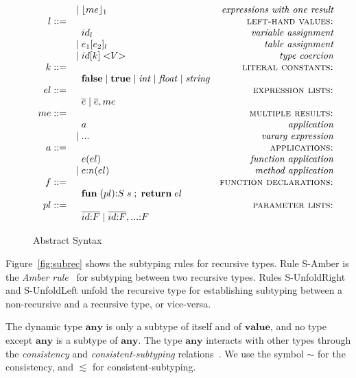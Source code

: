 \documentclass[preprint]{sigplanconf}
\newcommand{\Value}{\mathbf{value}}
\newcommand{\Any}{\mathbf{any}}
\begin{document}
\begin{figure*}[t]
$$\begin{array}{rlr}
	& | \; \lfloor me \rfloor_{1} & \textit{expressions with one result}\\
	l ::= & & \textsc{left-hand values:}\\
	& \;\; id_{l} & \textit{variable assignment}\\
	& | \; e_{1}[e_{2}]_{l} & \textit{table assignment}\\
	& | \; id[k] \; {<}V{>} & \textit{type coercion}\\
	k ::= & & \textsc{literal constants:}\\
	& \;\; \mathbf{false} \; | \;
	\mathbf{true} \; | \;
	{\it int} \; | \;
	{\it float} \; | \;
	{\it string} & \\
	el ::= & & \textsc{expression lists:}\\
	& \;\; \overline{e} \; | \;
	\overline{e}, me & \\
	me ::= & & \textsc{multiple results:}\\
	& \;\; a & \textit{application}\\
	& | \; {...} & \textit{vararg expression}\\
	a ::= & & \textsc{applications:}\\
	& \;\; e(el) & \textit{function application}\\
	& | \; e{:}n(el) & \textit{method application}\\
	f ::= & & \textsc{function declarations:}\\
	& \;\; \mathbf{fun} \; (pl){:}S \; s \;;\; \mathbf{return} \; el & \\
	pl ::= & & \textsc{parameter lists:}\\
	& \;\; \overline{id{:}F} \; | \;
	\overline{id{:}F},{...}{:}F & \\
	\end{array}
	$$
	\caption{Abstract Syntax}
	\label{fig:syntax}
\end{figure*}

Figure~\ref{fig:subrec} shows the subtyping rules for
recursive types. Rule {\sc S-Amber} is the \emph{Amber rule}~\cite{cardelli1986amber} for subtyping between
two recursive types. Rules {\sc S-UnfoldRight} and {\sc S-UnfoldLeft} unfold the recursive type for establishing
subtyping between a non-recursive and a recursive type,
or vice-versa.

The dynamic type $\Any$ is only a subtype of itself and of
$\Value$, and no type except $\Any$ is a subtype of $\Any$.
The type $\Any$ interacts with other types through the
{\em consistency} and {\em consistent-subtyping} 
relations~\cite{siek2007objects}. We use the symbol $\sim$ for
the consistency, and $\lesssim$ for consistent-subtyping.
\end{document}
